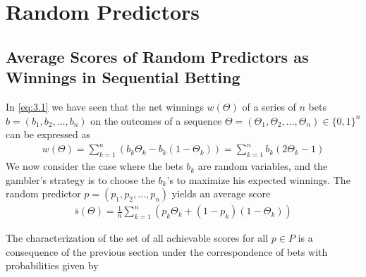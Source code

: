 \documentclass[11pt]{article}
\numberwithin{equation}{section}
\theoremstyle{boldStyle}
\begin{document}
\section{Random Predictors}

\subsection{Average Scores of Random Predictors as Winnings in Sequential Betting}

In \ref{eq:3.1} we have seen that the net winnings $w(\Theta)$ of a series of $n$ bets $b = (b_1, b_2, \ldots, b_n)$ 
on the outcomes of a sequence $\Theta = (\Theta_1, \Theta_2, \ldots, \Theta_n) \in \{0, 1\}^n$ can be expressed as
\begin{align*}
    w(\Theta) = \sum_{k=1}^n \left( b_k \Theta_k - b_k(1 - \Theta_k) \right)  = \sum_{k=1}^n b_k(2\Theta_k - 1)
\end{align*}
We now consider the case where the bets $b_k$ are random variables, and the gambler's strategy is to choose the $b_k$'s to maximize his expected winnings.
The random predictor $p = (p_1, p_2, \ldots, p_n)$ yields an average score 
\begin{align}
    \bar{s}(\Theta) = \frac{1}{n} \sum_{k=1}^{n} \left( p_k \Theta_k + (1 - p_k)(1 - \Theta_k) \right)
\end{align}

The characterization of the set of all achievable scores for all $p \in P$ is a consequence of the previous section 
under the correspondence of bets with probabilities given by 
\end{document}
